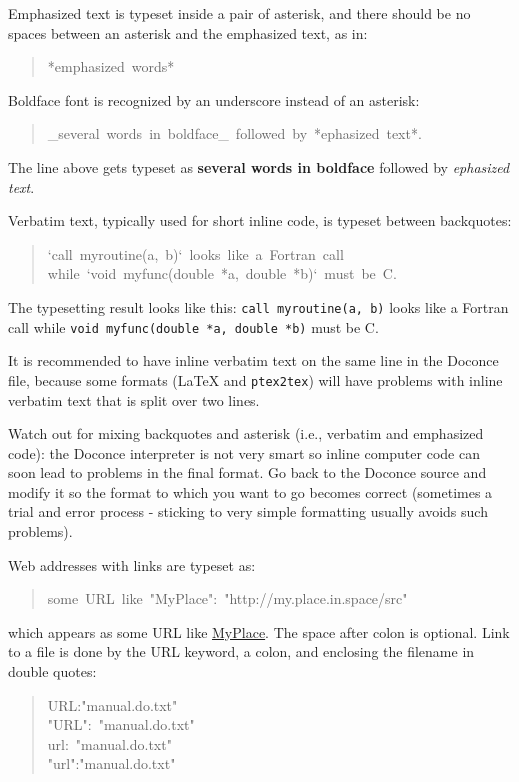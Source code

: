 \documentclass[a4paper,english]{article}
\begin{document}
Emphasized text is typeset inside a pair of asterisk, and there should
be no spaces between an asterisk and the emphasized text, as in:
%
\begin{quote}{\ttfamily \raggedright \noindent
*emphasized~words*
}
\end{quote}

Boldface font is recognized by an underscore instead of an asterisk:
%
\begin{quote}{\ttfamily \raggedright \noindent
\_several~words~in~boldface\_~followed~by~*ephasized~text*.
}
\end{quote}

The line above gets typeset as
\textbf{several words in boldface} followed by \emph{ephasized text}.

Verbatim text, typically used for short inline code,
is typeset between backquotes:
%
\begin{quote}{\ttfamily \raggedright \noindent
`call~myroutine(a,~b)`~looks~like~a~Fortran~call\\
while~`void~myfunc(double~*a,~double~*b)`~must~be~C.
}
\end{quote}

The typesetting result looks like this:
\texttt{call myroutine(a, b)} looks like a Fortran call
while \texttt{void myfunc(double *a, double *b)} must be C.

It is recommended to have inline verbatim text on the same line in
the Doconce file, because some formats (LaTeX and \texttt{ptex2tex}) will have
problems with inline verbatim text that is split over two lines.

Watch out for mixing backquotes and asterisk (i.e., verbatim and
emphasized code): the Doconce interpreter is not very smart so inline
computer code can soon lead to problems in the final format. Go back to the
Doconce source and modify it so the format to which you want to go
becomes correct (sometimes a trial and error process - sticking to
very simple formatting usually avoids such problems).

Web addresses with links are typeset as:
%
\begin{quote}{\ttfamily \raggedright \noindent
some~URL~like~"MyPlace":~"http://my.place.in.space/src"
}
\end{quote}

which appears as some URL like \href{http://my.place.in.space/src}{MyPlace}.
The space after colon is optional.
Link to a file is done by the URL keyword, a colon, and enclosing the
filename in double quotes:
%
\begin{quote}{\ttfamily \raggedright \noindent
URL:"manual.do.txt"\\
"URL":~"manual.do.txt"\\
url:~"manual.do.txt"\\
"url":"manual.do.txt"
}
\end{quote}
\end{document}
